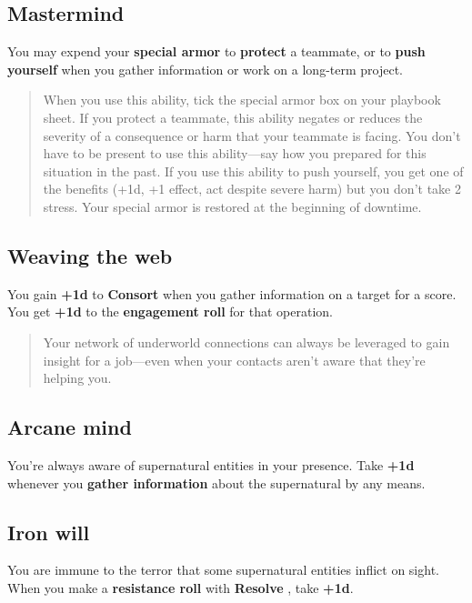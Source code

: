 \documentclass[11pt,oneside]{book}
\newcommand{\gameterm}[1]{\textbf{#1}}
\begin{document}
\subsection{Mastermind}

You may expend your \textbf{special armor} to \textbf{protect} a teammate, or to \textbf{push yourself} when you gather information or work on a long-term project.

\begin{quote}
	When you use this ability, tick the special armor box on your playbook sheet. If you protect a teammate, this ability negates or reduces the severity of a consequence or harm that your teammate is facing. You don’t have to be present to use this ability---say how you prepared for this situation in the past. If you use this ability to push yourself, you get one of the benefits (+1d, +1 effect, act despite severe harm) but you don’t take 2 stress. Your special armor is restored at the beginning of downtime.
\end{quote} 

\subsection{Weaving the web}

You gain \textbf{+1d} to \gameterm{Consort}  when you gather information on a target for a score. You get \textbf{+1d} to the \textbf{engagement roll} for that operation.

\begin{quote}
	Your network of underworld connections can always be leveraged to gain insight for a job---even when your contacts aren’t aware that they’re helping you.
\end{quote} 

\subsection{Arcane mind}

You’re always aware of supernatural entities in your presence. Take \textbf{+1d} whenever you \textbf{gather information} about the supernatural by any means.

\subsection{Iron will}

You are immune to the terror that some supernatural entities inflict on sight. When you make a \textbf{resistance roll }with \gameterm{Resolve} , take \textbf{+1d}.
\end{document}
